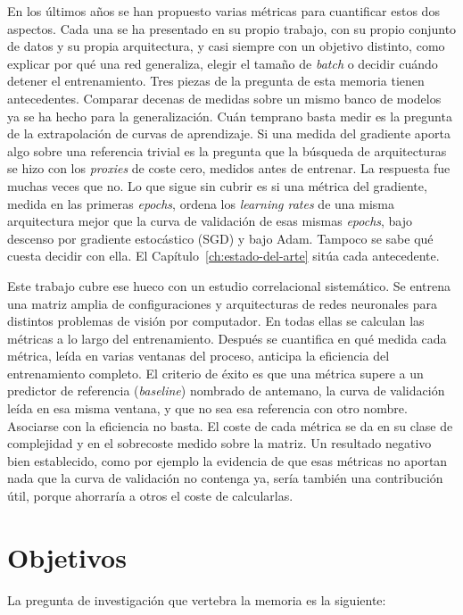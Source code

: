En los últimos años se han propuesto varias métricas para cuantificar estos dos aspectos. Cada una se ha presentado en su propio trabajo, con su propio conjunto de datos y su propia arquitectura, y casi siempre con un objetivo distinto, como explicar por qué una red generaliza, elegir el tamaño de \emph{batch} o decidir cuándo detener el entrenamiento. Tres piezas de la pregunta de esta memoria tienen antecedentes. Comparar decenas de medidas sobre un mismo banco de modelos ya se ha hecho para la generalización. Cuán temprano basta medir es la pregunta de la extrapolación de curvas de aprendizaje. Si una medida del gradiente aporta algo sobre una referencia trivial es la pregunta que la búsqueda de arquitecturas se hizo con los \emph{proxies} de coste cero, medidos antes de entrenar. La respuesta fue muchas veces que no. Lo que sigue sin cubrir es si una métrica del gradiente, medida en las primeras \emph{epochs}, ordena los \emph{learning rates} de una misma arquitectura mejor que la curva de validación de esas mismas \emph{epochs}, bajo descenso por gradiente estocástico (SGD) y bajo Adam. Tampoco se sabe qué cuesta decidir con ella. El Capítulo~\ref{ch:estado-del-arte} sitúa cada antecedente.

Este trabajo cubre ese hueco con un estudio correlacional sistemático. Se entrena una matriz amplia de configuraciones y arquitecturas de redes neuronales para distintos problemas de visión por computador. En todas ellas se calculan las métricas a lo largo del entrenamiento. Después se cuantifica en qué medida cada métrica, leída en varias ventanas del proceso, anticipa la eficiencia del entrenamiento completo. El criterio de éxito es que una métrica supere a un predictor de referencia (\emph{baseline}) nombrado de antemano, la curva de validación leída en esa misma ventana, y que no sea esa referencia con otro nombre. Asociarse con la eficiencia no basta. El coste de cada métrica se da en su clase de complejidad y en el sobrecoste medido sobre la matriz. Un resultado negativo bien establecido, como por ejemplo la evidencia de que esas métricas no aportan nada que la curva de validación no contenga ya, sería también una contribución útil, porque ahorraría a otros el coste de calcularlas.

\section{Objetivos}
\label{sec:objetivos}

La pregunta de investigación que vertebra la memoria es la siguiente:

